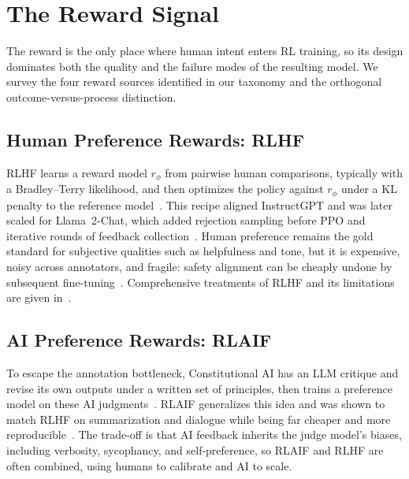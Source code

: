 \section{The Reward Signal}\label{sec:reward}

The reward is the only place where human intent enters RL training, so
its design dominates both the quality and the failure modes of the
resulting model. We survey the four reward sources identified in our
taxonomy and the orthogonal outcome-versus-process distinction.

\subsection{Human Preference Rewards: RLHF}

RLHF learns a reward model $r_\phi$ from pairwise human comparisons,
typically with a Bradley--Terry likelihood, and then optimizes the policy
against $r_\phi$ under a KL penalty to the reference
model~\cite{christiano2017deeprl,stiennon2020summarize,ouyang2022instructgpt}.
This recipe aligned InstructGPT and was later scaled for Llama~2-Chat,
which added rejection sampling before PPO and iterative rounds of
feedback collection~\cite{touvron2023llama2}.  Human preference remains
the gold standard for subjective qualities such as helpfulness and tone,
but it is expensive, noisy across annotators, and fragile: safety
alignment can be cheaply undone by subsequent
fine-tuning~\cite{qi2024finetuning,lermen2024lora}.  Comprehensive
treatments of RLHF and its limitations are given
in~\cite{kaufmann2024survey,casper2023open,lambert2024rlhfbook}.

\subsection{AI Preference Rewards: RLAIF}

To escape the annotation bottleneck, Constitutional AI has an LLM
critique and revise its own outputs under a written set of principles,
then trains a preference model on these AI
judgments~\cite{bai2022constitutional}.  RLAIF generalizes this idea and
was shown to match RLHF on summarization and dialogue while being far
cheaper and more reproducible~\cite{lee2023rlaif}.  The trade-off is that
AI feedback inherits the judge model's biases, including verbosity,
sycophancy, and self-preference, so RLAIF and RLHF are often combined,
using humans to calibrate and AI to scale.

